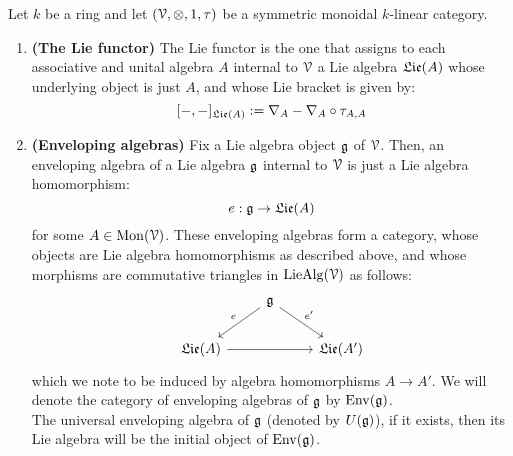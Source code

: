         \begin{definition} \label{def: enveloping_algebras}
            Let $k$ be a ring and let $(\calV, \tensor, 1, \tau)$ be a symmetric monoidal $k$-linear category.
                \begin{enumerate}
                    \item \textbf{(The Lie functor)} The Lie functor is the one that assigns to each associative and unital algebra $A$ internal to $\mathcal{V}$ a Lie algebra $\mathfrak{Lie}(A)$ whose underlying object is just $A$, and whose Lie bracket is given by:
                        $$[-,-]_{\mathfrak{Lie}(A)} := \nabla_A - \nabla_A \circ \tau_{A,A}$$
                    \item \textbf{(Enveloping algebras)} Fix a Lie algebra object $\mathfrak{g}$ of $\mathcal{V}$. Then, an enveloping algebra of a Lie algebra $\mathfrak{g}$ internal to $\mathcal{V}$ is just a Lie algebra homomorphism:
                        $$e: \mathfrak{g} \to \mathfrak{Lie}(A)$$
                    for some $A \in \mathrm{Mon}(\mathcal{V})$. These enveloping algebras form a category, whose objects are Lie algebra homomorphisms as described above, and whose morphisms are commutative triangles in $\mathrm{Lie}\mathrm{Alg}(\mathcal{V})$ as follows:
                        $$
                            \begin{tikzcd}
                            	& {\g} \\
                            	{\frakLie(A)} && {\frakLie(A')}
                            	\arrow[from=2-1, to=2-3]
                            	\arrow["{e}"', from=1-2, to=2-1]
                            	\arrow["{e'}", from=1-2, to=2-3]
                            \end{tikzcd}
                        $$
                    which we note to be induced by algebra homomorphisms $A \to A'$. We will denote the category of enveloping algebras of $\mathfrak{g}$ by $\mathrm{Env}(\mathfrak{g})$. 
                    \\
                    The universal enveloping algebra of $\mathfrak{g}$ (denoted by $U(\mathfrak{g})$), if it exists, then its Lie algebra will be the initial object of $\mathrm{Env}(\mathfrak{g})$. 
                \end{enumerate}
        \end{definition}
        
